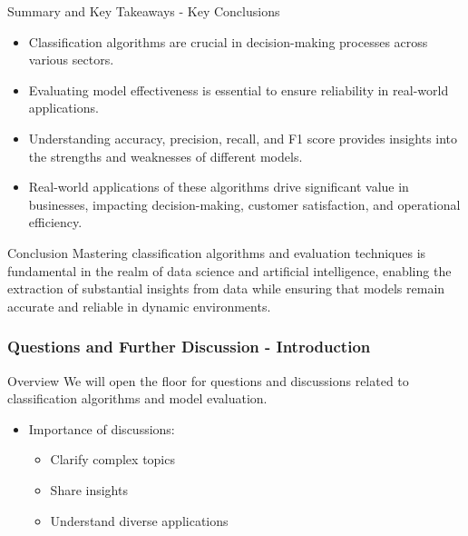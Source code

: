 \documentclass[aspectratio=169]{beamer}
\begin{document}
\begin{frame}[fragile]{Summary and Key Takeaways - Key Conclusions}
    \begin{itemize}
        \item Classification algorithms are crucial in decision-making processes across various sectors.
        \item Evaluating model effectiveness is essential to ensure reliability in real-world applications.
        \item Understanding accuracy, precision, recall, and F1 score provides insights into the strengths and weaknesses of different models.
        \item Real-world applications of these algorithms drive significant value in businesses, impacting decision-making, customer satisfaction, and operational efficiency.
    \end{itemize}
    \begin{block}{Conclusion}
        Mastering classification algorithms and evaluation techniques is fundamental in the realm of data science and artificial intelligence, enabling the extraction of substantial insights from data while ensuring that models remain accurate and reliable in dynamic environments.
    \end{block}
\end{frame}

\begin{frame}[fragile]
    \frametitle{Questions and Further Discussion - Introduction}
    \begin{block}{Overview}
        We will open the floor for questions and discussions related to classification algorithms and model evaluation.
    \end{block}
    \begin{itemize}
        \item Importance of discussions: 
        \begin{itemize}
            \item Clarify complex topics
            \item Share insights
            \item Understand diverse applications
        \end{itemize}
    \end{itemize}
\end{frame}
\end{document}
